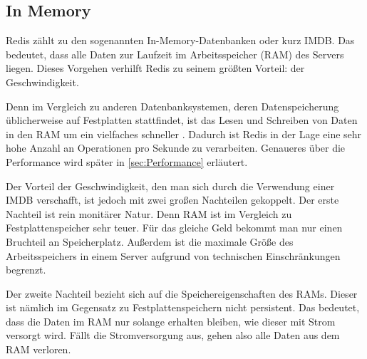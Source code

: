 
\subsection{In Memory}
\label{subsec:inMemory}

Redis zählt zu den sogenannten In-Memory-Datenbanken oder kurz \acs{IMDB}. 
Das bedeutet, dass alle Daten zur Laufzeit im Arbeitsspeicher (RAM) des Servers liegen.
Dieses Vorgehen verhilft Redis zu seinem größten Vorteil: der Geschwindigkeit.

Denn im Vergleich zu anderen Datenbanksystemen, deren Datenspeicherung üblicherweise auf Festplatten stattfindet, ist das Lesen und Schreiben von Daten in den RAM um ein vielfaches schneller \cite{VL_Rechnerarchitektur}.
Dadurch ist Redis in der Lage eine sehr hohe Anzahl an Operationen pro Sekunde zu verarbeiten.
Genaueres über die Performance wird später in \autoref{sec:Performance} erläutert.

Der Vorteil der Geschwindigkeit, den man sich durch die Verwendung einer \acs{IMDB} verschafft, ist jedoch mit zwei großen Nachteilen gekoppelt.
Der erste Nachteil ist rein monitärer Natur. 
Denn RAM ist im Vergleich zu Festplattenspeicher sehr teuer. Für das gleiche Geld bekommt man nur einen Bruchteil an Speicherplatz.
Außerdem ist die maximale Größe des Arbeitsspeichers in einem Server aufgrund von technischen Einschränkungen begrenzt.

Der zweite Nachteil bezieht sich auf die Speichereigenschaften des RAMs.
Dieser ist nämlich im Gegensatz zu Festplattenspeichern nicht persistent.
Das bedeutet, dass die Daten im RAM nur solange erhalten bleiben, wie dieser mit Strom versorgt wird.
Fällt die Stromversorgung aus, gehen also alle Daten aus dem RAM verloren. 